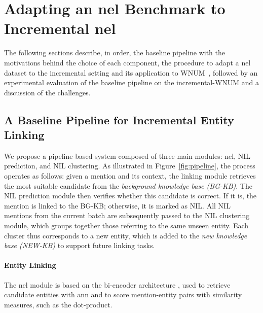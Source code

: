 \section{Adapting an \ac{nel} Benchmark to Incremental \ac{nel}}
\label{sec:incrementalel:pipeline}

The following sections describe, in order, the baseline pipeline with the motivations behind the choice of each component, the procedure to adapt a \ac{nel} dataset to the incremental setting and its application to WNUM~\cite{Onoe_Durrett_2020}, followed by an experimental evaluation of the baseline pipeline on the incremental-WNUM and a discussion of the challenges.

\subsection{A Baseline Pipeline for Incremental Entity Linking}

We propose a pipeline-based system composed of three main modules: \ac{nel}, NIL prediction, and NIL clustering. As illustrated in Figure~\ref{fig:pipeline}, the process operates as follows: given a mention and its context, the linking module retrieves the most suitable candidate from the \emph{background knowledge base (BG-KB)}. The NIL prediction module then verifies whether this candidate is correct. If it is, the mention is linked to the BG-KB; otherwise, it is marked as NIL. All NIL mentions from the current batch are subsequently passed to the NIL clustering module, which groups together those referring to the same unseen entity. Each cluster thus corresponds to a new entity, which is added to the \emph{new knowledge base (NEW-KB)} to support future linking tasks. 



\paragraph{Entity Linking}
The \ac{nel} module is based on the bi-encoder architecture \cite{Humeau2020Poly-encoders,blink,gillick-etal-2019-learning}, used to retrieve candidate entities with \ac{ann} and to score mention-entity pairs with similarity measures, such as the dot-product. 



